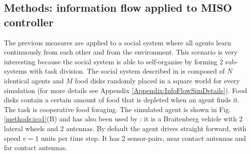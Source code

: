 \subsection{Methods: information flow applied to MISO controller}
The previous measures are applied to a social system where all agents learn continuously
from each other and from the environment. This scenario is very interesting because
the social system is able to self-organise by forming 2 sub-systems with task division.
The social system described in \citet{DiProdiMultiAgent} is composed of $N$
identical agents and $M$ food disks randomly placed in a square world for
every simulation (for more details see Appendix \ref{Appendix:InfoFlowSimDetails}).
Food disks contain a certain amount of food that is depleted
when an agent finds it. The task is cooperative food foraging.
The simulated agent is shown in Fig.\ref{methods:ico1}(B) and has also been used
by \citet{Kulvicius2009:analysisdifferential}:
it is a Braitenberg \citep{Braitenberg} vehicle with 2
lateral wheels and 2 antennas. By default the agent drives straight forward,
with speed $v=1$ units per time step. It has 2 sensor-pairs, near contact
antennas and far contact antennas.

